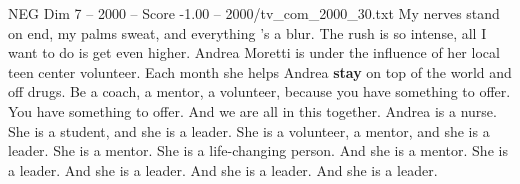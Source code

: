 \begin{textsample}{NEG Dim 7 – 2000 – Score -1.00 – 2000/tv\_com\_2000\_30.txt}  \label{ex:f7_neg_040}
My nerves stand on end, my palms sweat, and everything 's a blur.
The rush is so intense, all I want to do is get even higher.
Andrea Moretti is under the influence of her local teen center volunteer.
Each month she helps Andrea \textbf{stay} on top of the world and off drugs.
Be a coach, a mentor, a volunteer, because you have something to offer.
You have something to offer.
And we are all in this together.
Andrea is a nurse.
She is a student, and she is a leader.
She is a volunteer, a mentor, and she is a leader.
She is a mentor.
She is a life-changing person.
And she is a mentor.
She is a leader.
And she is a leader.
And she is a leader.
And she is a leader.

\end{textsample}
